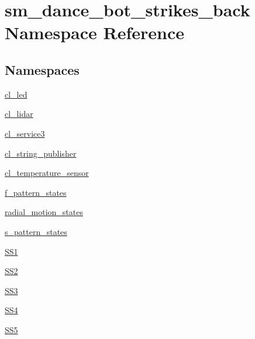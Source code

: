\hypertarget{namespacesm__dance__bot__strikes__back}{}\section{sm\+\_\+dance\+\_\+bot\+\_\+strikes\+\_\+back Namespace Reference}
\label{namespacesm__dance__bot__strikes__back}
\subsection*{Namespaces}
\begin{DoxyCompactItemize}
\item 
 \hyperlink{namespacesm__dance__bot__strikes__back_1_1cl__led}{cl\+\_\+led}
\item 
 \hyperlink{namespacesm__dance__bot__strikes__back_1_1cl__lidar}{cl\+\_\+lidar}
\item 
 \hyperlink{namespacesm__dance__bot__strikes__back_1_1cl__service3}{cl\+\_\+service3}
\item 
 \hyperlink{namespacesm__dance__bot__strikes__back_1_1cl__string__publisher}{cl\+\_\+string\+\_\+publisher}
\item 
 \hyperlink{namespacesm__dance__bot__strikes__back_1_1cl__temperature__sensor}{cl\+\_\+temperature\+\_\+sensor}
\item 
 \hyperlink{namespacesm__dance__bot__strikes__back_1_1f__pattern__states}{f\+\_\+pattern\+\_\+states}
\item 
 \hyperlink{namespacesm__dance__bot__strikes__back_1_1radial__motion__states}{radial\+\_\+motion\+\_\+states}
\item 
 \hyperlink{namespacesm__dance__bot__strikes__back_1_1s__pattern__states}{s\+\_\+pattern\+\_\+states}
\item 
 \hyperlink{namespacesm__dance__bot__strikes__back_1_1SS1}{S\+S1}
\item 
 \hyperlink{namespacesm__dance__bot__strikes__back_1_1SS2}{S\+S2}
\item 
 \hyperlink{namespacesm__dance__bot__strikes__back_1_1SS3}{S\+S3}
\item 
 \hyperlink{namespacesm__dance__bot__strikes__back_1_1SS4}{S\+S4}
\item 
 \hyperlink{namespacesm__dance__bot__strikes__back_1_1SS5}{S\+S5}
\end{DoxyCompactItemize}

